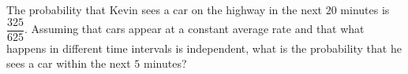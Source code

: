 The probability that Kevin sees a car on the highway in the next $20$ minutes is $\dfrac{325}{625}$. Assuming that cars appear at a constant average rate and that what happens in different time intervals is independent, what is the probability that he sees a car within the next $5$ minutes?
